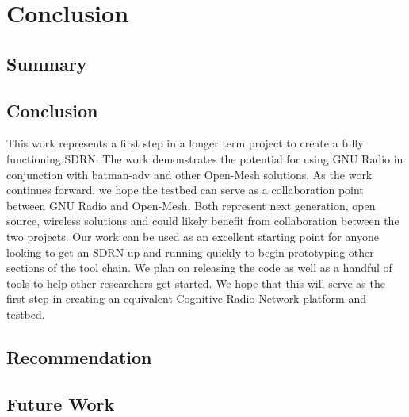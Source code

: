 
\chapter{Conclusion} %

\label{Chapter6} %




\section{Summary}


\section{Conclusion}

This work represents a first step in a longer term project to create a fully functioning SDRN. The work demonstrates the potential for using GNU Radio in conjunction with batman-adv and other Open-Mesh solutions. As the work continues forward, we hope the testbed can serve as a collaboration point between GNU Radio and Open-Mesh. Both represent next generation, open source, wireless solutions and could likely benefit from collaboration between the two projects. Our work can be used as an excellent starting point for anyone looking to get an SDRN up and running quickly to begin prototyping other sections of the tool chain. We plan on releasing the code as well as a handful of tools to help other researchers get started. We hope that this will serve as the first step in creating an equivalent Cognitive Radio Network platform and testbed. 


\section{Recommendation}


\section{Future Work}

